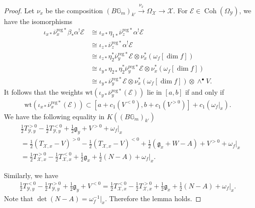 \documentclass [11pt,oneside,a4paper,mathscr]{amsart}
\theoremstyle{definition}
\newcommand{\Y}{\mathcal{Y}}
\newcommand{\X}{\mathcal{X}}
\newcommand{\bgm}{B\mathbb{G}_m}
\newcommand{\Coh}{\operatorname{Coh}}
\newcommand{\wt}{\mathrm{wt}}
\begin{document}
\begin{proof}
Let $\nu_x$ be the composition 
$(\bgm)_{k'} \stackrel{\nu_{\overline{x}}}{\to} \Omega_{\X} \to \X$.
For $\mathcal{E} \in \Coh(\Omega_{\Y})$, we have 
the isomorphisms 
\begin{align*}    \iota_{x\ast}\overline{\nu}_x^{\mathrm{reg}\ast}\beta_{\ast}\alpha^{!}\mathcal{E} &\cong \iota_{x\ast}\eta_{1\ast}\overline{\nu}_z^{\mathrm{reg}\ast}\alpha^{!}\mathcal{E} \\
&\cong \iota_{z\ast}\overline{\nu}_z^{\mathrm{reg}\ast}\alpha^{!}\mathcal{E} \\
& \cong \iota_{z\ast}\eta_2^{\ast}\overline{\nu}_y^{\mathrm{reg}\ast}\mathcal{E}\otimes \nu_x^*(\omega_f[\dim f]) \\
&\cong \iota_{y\ast}\eta_{2\ast}\eta_2^{\ast}\overline{\nu}_y^{\mathrm{reg}\ast}\mathcal{E}\otimes \nu_x^*(\omega_f[\dim f]) \\
&\cong \iota_{y\ast}\overline{\nu}_y^{\mathrm{reg}\ast}\mathcal{E}\otimes \nu_x^*(\omega_f[\dim f])\otimes 
\wedge^{\bullet}V. 
\end{align*}
  It follows that 
the weights
$\wt(\iota_{y\ast}\overline{\nu}_y^{\mathrm{reg}\ast}(\mathcal{E}))$ lie in $[a, b]$ if and only if 
\begin{align*}
    \wt(\iota_{x\ast}\overline{\nu}_x^{\mathrm{reg}\ast}(\mathcal{E}))
    \subset [a+c_1(V^{<0}), b+c_1(V^{>0})]+c_1(\omega_f|_{x}). 
\end{align*}
We have the following equality in $K((\bgm)_{k'})$
\begin{align*}
    &\frac{1}{2}T_{\Y, y}^{>0}-\frac{1}{2}T_{\Y, y}^{<0}
    +\frac{1}{2}\mathfrak{g}_y+V^{>0}+\omega_f|_{x}  \\
    &=\frac{1}{2}(T_{\X, x}-V)^{>0}-\frac{1}{2}(T_{\X, x}-V)^{<0}+\frac{1}{2}(\mathfrak{g}_x+W-A)+V^{>0} +\omega_f|_{x} \\
    &=\frac{1}{2}T_{\X, x}^{>0}-\frac{1}{2}T_{\X, x}^{<0}
    +\frac{1}{2}\mathfrak{g}_x+\frac{1}{2}(N-A)+\omega_f|_{x}. 
\end{align*}

Similarly, we have 
\begin{align*}
\frac{1}{2}T_{\Y, y}^{<0}-\frac{1}{2}T_{\Y, y}^{>0}
    +\frac{1}{2}\mathfrak{g}_y+V^{<0} 
    =\frac{1}{2}T_{\X, x}^{<0}-\frac{1}{2}T_{\X, x}^{>0}
    +\frac{1}{2}\mathfrak{g}_x+\frac{1}{2}(N-A)+\omega_f|_{x}. 
    \end{align*}
    Note that $\det (N-A)=\omega_{f}^{-1}|_{x}$. 
    Therefore the lemma holds. 

            
\end{proof}
\end{document}
